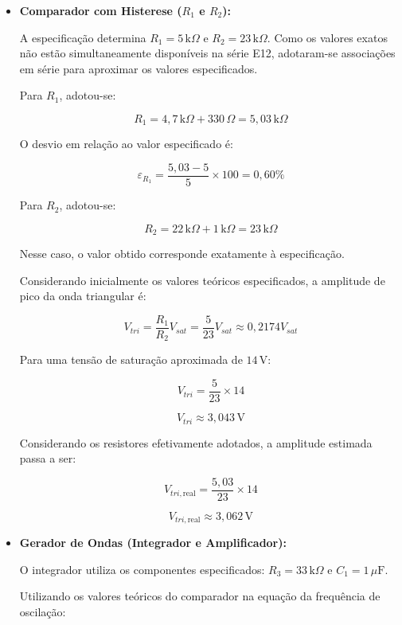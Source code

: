 \documentclass[11pt,a4paper]{article}
\begin{document}
\begin{itemize}

    \item \textbf{Comparador com Histerese ($R_1$ e $R_2$):}

    A especificação determina $R_1=5\,\text{k}\Omega$ e
    $R_2=23\,\text{k}\Omega$. Como os valores exatos não estão
    simultaneamente disponíveis na série E12, adotaram-se associações
    em série para aproximar os valores especificados.

    Para $R_1$, adotou-se:

    \[
    R_1=4{,}7\,\text{k}\Omega+330\,\Omega
    =5{,}03\,\text{k}\Omega
    \]

    O desvio em relação ao valor especificado é:

    \[
    \varepsilon_{R_1}
    =\frac{5{,}03-5}{5}\times100
    =0{,}60\%
    \]

    Para $R_2$, adotou-se:

    \[
    R_2=22\,\text{k}\Omega+1\,\text{k}\Omega
    =23\,\text{k}\Omega
    \]

    Nesse caso, o valor obtido corresponde exatamente à especificação.

    Considerando inicialmente os valores teóricos especificados, a
    amplitude de pico da onda triangular é:

    \[
    V_{tri}=\frac{R_1}{R_2}V_{sat}
    =\frac{5}{23}V_{sat}
    \approx0{,}2174V_{sat}
    \]

    Para uma tensão de saturação aproximada de $14\,\text{V}$:

    \[
    V_{tri}=\frac{5}{23}\times14
    \]

    \[
    \boxed{V_{tri}\approx3{,}043\,\text{V}}
    \]

    Considerando os resistores efetivamente adotados, a amplitude
    estimada passa a ser:

    \[
    V_{tri,\text{real}}
    =\frac{5{,}03}{23}\times14
    \]

    \[
    \boxed{V_{tri,\text{real}}\approx3{,}062\,\text{V}}
    \]

    \item \textbf{Gerador de Ondas (Integrador e Amplificador):}

    O integrador utiliza os componentes especificados:
    $R_3=33\,\text{k}\Omega$ e $C_1=1\,\mu\text{F}$.

    Utilizando os valores teóricos do comparador na equação da
    frequência de oscilação:


\end{itemize}
\end{document}
